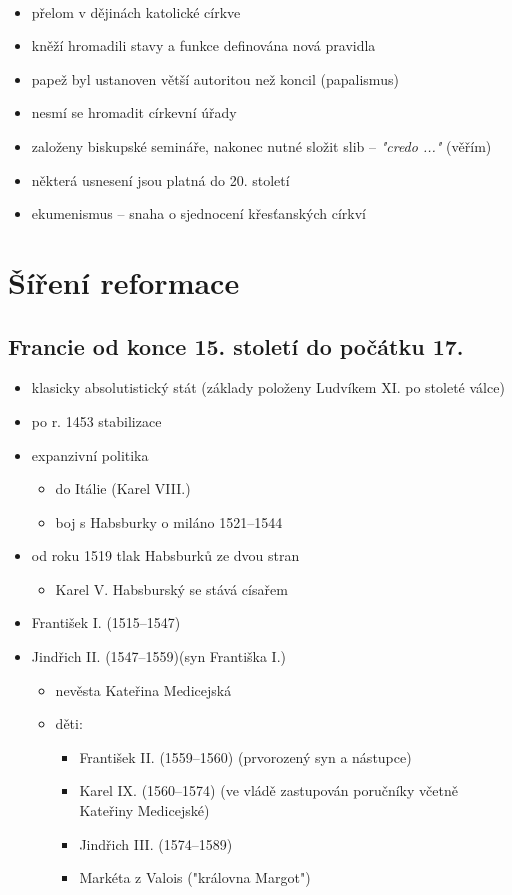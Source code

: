\paragraph{}
\begin{itemize}
\item přelom v dějinách katolické církve
\item kněží hromadili stavy a funkce \ra definována nová pravidla
\item papež byl ustanoven větší autoritou než koncil (papalismus)
\item nesmí se hromadit církevní úřady
\item založeny biskupské semináře, nakonec nutné složit slib -- \textit{"credo ..."} (věřím)
\item některá usnesení jsou platná do 20. století
\item ekumenismus -- snaha o sjednocení křesťanských církví
\end{itemize}


\section{Šíření reformace}
\subsection{Francie od konce 15. století do počátku 17.}
\begin{itemize}
\item klasicky absolutistický stát (základy položeny Ludvíkem XI. po stoleté válce)
\item po r. 1453 stabilizace 
\item expanzivní politika
	\begin{itemize}
	\item do Itálie (Karel VIII.)
	\item boj s Habsburky o miláno 1521--1544
	\end{itemize}
\item od roku 1519 tlak Habsburků ze dvou stran
	\begin{itemize}
	\item Karel V. Habsburský se stává císařem
	\end{itemize}
\item František I. (1515--1547)
\item Jindřich II. (1547--1559)(syn Františka I.)
	\begin{itemize}
	\item nevěsta Kateřina Medicejská
	\item děti:
		\begin{itemize}
		\item František II. (1559--1560) (prvorozený syn a nástupce)
		\item Karel IX. (1560--1574) (ve vládě zastupován poručníky včetně Kateřiny Medicejské)
		\item Jindřich III. (1574--1589) 
		\item Markéta z Valois ("královna Margot")
		\end{itemize}
	\end{itemize}
\end{itemize}

